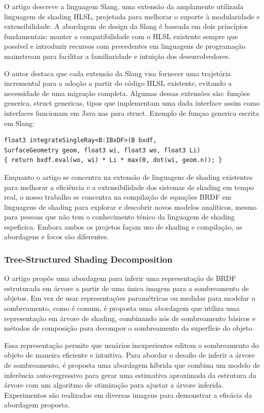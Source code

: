 \documentclass[english, 
               brazil, 
               bsc] %
               {dcomp-abntex2}
\begin{document}
O artigo descreve a linguagem Slang, uma extensão da amplamente utilizada linguagem de shading HLSL, projetada para melhorar o suporte à modularidade e extensibilidade. A abordagem de design da Slang é baseada em dois princípios fundamentais: manter a compatibilidade com o HLSL existente sempre que possível e introduzir recursos com precedentes em linguagens de programação mainstream para facilitar a familiaridade e intuição dos desenvolvedores.

O autor destaca que cada extensão da Slang visa fornecer uma trajetória incremental para a adoção a partir do código HLSL existente, evitando a necessidade de uma migração completa. Algumas dessas extensões são: funções generica, struct genericas, tipos que implementam uma dada interface assim como interfaces funcionam em Java nas para struct.
Exemplo de funçao generica escrita em Slang:

\begin{verbatim}
float3 integrateSingleRay<B:IBxDF>(B bxdf,
SurfaceGeometry geom, float3 wi, float3 wo, float3 Li)
{ return bxdf.eval(wo, wi) * Li * max(0, dot(wi, geom.n)); }

\end{verbatim}


Enquanto o artigo se concentra na extensão de linguagens de shading existentes para melhorar a eficiência e a extensibilidade dos sistemas de shading em tempo real, o nosso trabalho se concentra na compilação de equações BRDF em linguagens de shading para explorar e descobrir novos modelos analíticos, mesmo para pessoas que não tem o conhecimento ténico da linguagem de shading espeficica. Embora ambos os projetos façam uso de shading e compilação, as abordagens e focos são diferentes.

\subsubsection{Tree-Structured Shading Decomposition}

O artigo propõe uma abordagem para inferir uma representação de BRDF estruturada em árvore a partir de uma única imagem para a sombreamento de objetos. Em vez de usar representações paramétricas ou medidas para modelar o sombreamento, como é comum, é proposta uma abordagem que utiliza uma representação em árvore de shading, combinando nós de sombreamento básicos e métodos de composição para decompor o sombreamento da superfície do objeto.

Essa representação permite que usuários inexperientes editem o sombreamento do objeto de maneira eficiente e intuitiva. Para abordar o desafio de inferir a árvore de sombreamento, é proposta uma abordagem híbrida que combina um modelo de inferência auto-regressivo para gerar uma estimativa aproximada da estrutura da árvore com um algoritmo de otimização para ajustar a árvore inferida. Experimentos são realizados em diversas imagens para demonstrar a eficácia da abordagem proposta.
\end{document}
